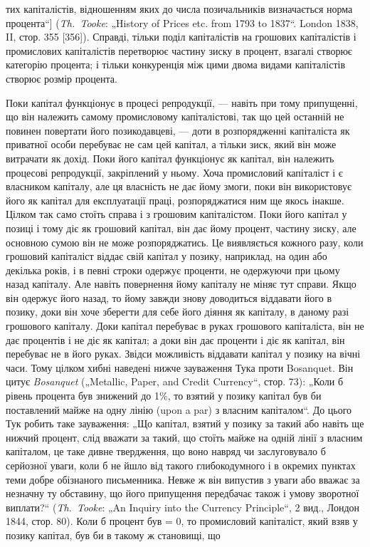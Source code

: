 \parcont{}  %
тих капіталістів, відношенням яких до числа позичальників визначається
норма процента“] (\emph{Th.~Tooke}: „History of Prices etc.
from 1793 to 1837“. London 1838, II, стор. 355 [356]). Справді, тільки
поділ капіталістів на грошових капіталістів і промислових капіталістів
перетворює частину зиску в процент, взагалі створює
категорію процента; і тільки конкуренція між цими двома видами
капіталістів створює розмір процента.

Поки капітал функціонує в процесі репродукції, — навіть при
тому припущенні, що він належить самому промисловому капіталістові,
так що цей останній не повинен повертати його позикодавцеві,
— доти в розпорядженні капіталіста як приватної
особи перебуває не сам цей капітал, а тільки зиск, який він
може витрачати як дохід. Поки його капітал функціонує як
капітал, він належить процесові репродукції, закріплений у ньому.
Хоча промисловий капіталіст і є власником капіталу, але ця власність
не дає йому змоги, поки він використовує його як капітал
для експлуатації праці, розпоряджатися ним ще якось інакше.
Цілком так само стоїть справа і з грошовим капіталістом. Поки
його капітал у позиці і тому діє як грошовий капітал, він
дає йому процент, частину зиску, але основною сумою він не
може розпоряджатись. Це виявляється кожного разу, коли грошовий
капіталіст віддає свій капітал у позику, наприклад, на
один або декілька років, і в певні строки одержує проценти,
не одержуючи при цьому назад капіталу. Але навіть повернення
йому капіталу не міняє тут справи. Якщо він одержує
його назад, то йому завжди знову доводиться віддавати його
в позику, доки він хоче зберегти для себе його діяння як
капіталу, в даному разі грошового капіталу. Доки капітал
перебуває в руках грошового капіталіста, він не дає процентів
і не діє як капітал; а доки він дає проценти і діє як капітал,
він перебуває не в його руках. Звідси можливість
віддавати капітал у позику на вічні часи. Тому цілком хибні
наведені нижче зауваження Тука проти Bosanquet. Він цитує
\emph{Bosanquet} („Metallic, Paper, and Credit Currency“, стор. 73):
„Коли б рівень процента був знижений до 1\%, то взятий
у позику капітал був би поставлений майже на одну лінію (upon
a par) з власним капіталом“. До цього Тук робить таке зауваження:
„Що капітал, взятий у позику за такий або навіть ще
нижчий процент, слід вважати за такий, що стоїть майже на
одній лінії з власним капіталом, це таке дивне твердження, що
воно навряд чи заслуговувало б серйозної уваги, коли б не
йшло від такого глибокодумного і в окремих пунктах теми
добре обізнаного письменника. Невже ж він випустив з уваги
або вважає за незначну ту обставину, що його припущення
передбачає також і умову зворотної виплати?“ (\emph{Th.~Tooke}: „An
Inquiry into the Currency Principle“, 2 вид., Лондон 1844,
стор. 80). Коли б процент був = 0, то промисловий капіталіст,
який взяв у позику капітал, був би в такому ж становищі, що
\parbreak{}  %
